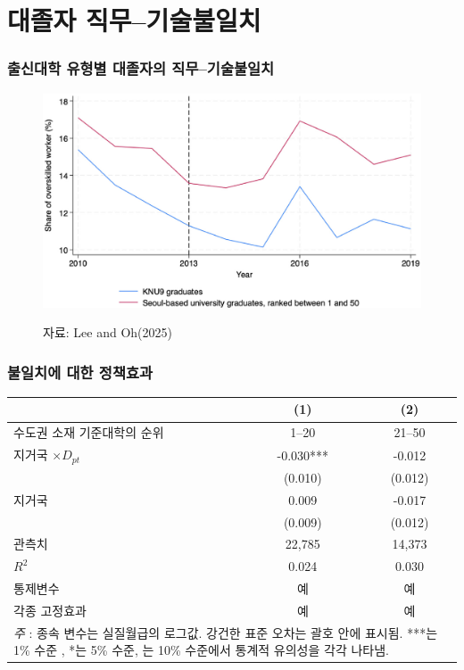 \documentclass[aspectratio=169,xcolor=dvipsnames,handout]{beamer}
\begin{document}
\section{대졸자 직무--기술불일치}%
\begin{frame}
    \frametitle{출신대학 유형별 대졸자의 직무--기술불일치}
    \centering
    \begin{figure}
        \includegraphics[width=.6\textwidth]{pic/기술불일치.png}
    \\
    \raggedright
    \hspace{1em}
    \tiny{자료: Lee and Oh(2025)}
    \end{figure}
\end{frame}

\begin{frame}
    \frametitle{불일치에 대한 정책효과}
    \begin{table}[ht]
        \tiny
        \centering
        \begin{tabular}{lcc}
        \toprule
        & \textbf{(1)} & \textbf{(2)} \\
        \midrule
        수도권 소재 기준대학의 순위 & 1--20     & 21--50  \\
        \midrule                                                                                  
        지거국 $\times D_{pt}$      & -0.030***  & -0.012   \\
                                                  & (0.010)   & (0.012)   \\
        지거국                      & 0.009 & -0.017 \\
                                                  & (0.009)   & (0.012)   \\
        \midrule                                                          
        관측치                              & 22,785 & 14,373    \\
        $R^2$                                 & 0.024     & 0.030     \\
        통제변수                                  & 예       & 예       \\
        각종 고정효과                                       & 예       & 예       \\
        \bottomrule
        \multicolumn{3}{p{6cm}}{\tiny\textit{주} : 종속 변수는 실질월급의 로그값. 강건한 표준 오차는 괄호 안에 표시됨. ***는 1\% 수준 , *는 5\% 수준, 는 10\% 수준에서 통계적 유의성을 각각 나타냄.} \\
        \end{tabular}
    \end{table}
\end{frame}
\end{document}
